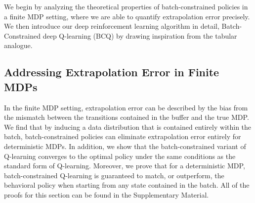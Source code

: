 \documentclass{article}
\begin{document}
We begin by analyzing the theoretical properties of batch-constrained policies in a finite MDP setting, where we are able to quantify extrapolation error precisely. We then introduce our deep reinforcement learning algorithm in detail, Batch-Constrained deep Q-learning (BCQ) by drawing inspiration from the tabular analogue.   



\subsection{Addressing Extrapolation Error in Finite MDPs} \label{sec:MDP}

In the finite MDP setting, extrapolation error can be described by the bias from the mismatch between the transitions contained in the buffer and the true MDP. 
We find that by inducing a data distribution that is contained entirely within the batch, batch-constrained policies can eliminate extrapolation error entirely for deterministic MDPs. 
In addition, we show that the batch-constrained variant of Q-learning converges to the optimal policy under the same conditions as the standard form of Q-learning. Moreover, we prove that for a deterministic MDP, batch-constrained Q-learning is guaranteed to match, or outperform, the behavioral policy when starting from any state contained in the batch. All of the proofs for this section can be found in the Supplementary Material. 
\end{document}
